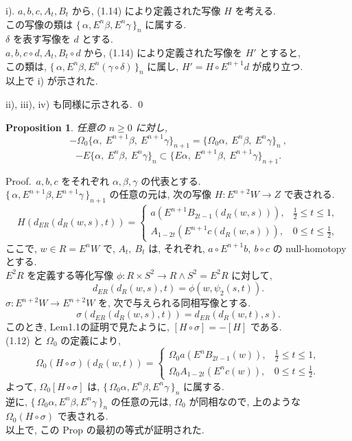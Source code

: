 \documentclass[12pt, leqno]{ltjsarticle}
\newcommand{\Ex}{E}        %
\newcommand{\todai}[2][]{\{\,#2\,\}_{#1}}      %
\numberwithin{equation}{section}
\theoremstyle{plain}
\newtheorem{proposition}[theorem]{Proposition}
\theoremstyle{definition}
\theoremstyle{remark}
\begin{document}
i). 
\(a,b,c,A_t,B_t\) から, (1.14) により定義された写像 \(H\)
を考える.\\
この写像の類は 
\(\todai[n]{\alpha, E^n\beta, E^n\gamma}\)
に属する.\\
\(\delta\) を表す写像を \(d\) とする.\\
\(a,b,c\circ d, A_t, B_t\circ d\) から, (1.14) により定義された写像を \(H'\)
とすると,\\
この類は, \(\todai[n]{\alpha, E^n\beta, E^n(\gamma\circ\delta)}\)
に属し, 
\(H'=H\circ E^{n+1}d\) が成り立つ.\\
以上で i) が示された.

ii), iii), iv) も同様に示される.
\qed


\begin{proposition}\label{prop:1-3}
任意の $n\ge 0$ に対し,
\[
-\Omega_0\bigl\{\alpha,\ \Ex^{n+1}\beta,\ \Ex^{n+1}\gamma\bigr\}_{n+1}
=
\bigl\{\Omega_0\alpha,\ \Ex^{n}\beta,\ \Ex^{n}\gamma\bigr\}_n \ ,
\]
\[
-\Ex\{\alpha,\ \Ex^n\beta,\ \Ex^n\gamma\}_n
\subset
\bigl\{E\alpha,\ \Ex^{n+1}\beta,\ \Ex^{n+1}\gamma\bigr\}_{n+1}.
\]
\end{proposition}

Proof.\
$a,b,c$ をそれぞれ $\alpha,\beta,\gamma$ の代表とする.\\
\(\todai[n+1]{\alpha, E^{n+1}\beta, E^{n+1}\gamma}\) 
の任意の元は, 次の写像 \(H:E^{n+2}W\to Z\)
で表される.
\[
H(d_{ER}(d_R(w,s),t))=
\begin{cases}
a(\Ex^{n+1}B_{2t-1}(d_R(w,s))), 
& \tfrac12\le t\le 1,\\[2mm]
A_{1-2t}(\Ex^{n+1}c(d_R(w,s))), 
& 0\le t\le \tfrac12,
\end{cases}
\]
ここで,
\(w\in R = E^n W\)
で,
\(A_t,\ B_t\) 
は, それぞれ,
\(a\circ E^{n+1}b,\ b\circ c\)
の null-homotopy とする.\\
\(E^2 R\) を定義する等化写像
\(\phi:R\times S^2\to R\wedge S^2 = E^2 R\)
に対して,
\[
d_{ER}(d_R(w,s),t) = \phi(w, \psi_2(s, t)).
\]
\(\sigma:E^{n+2}W\to E^{n+2}W\)
を, 次で与えられる同相写像とする.
\[
\sigma(d_{ER}(d_R(w,s),t))
= d_{ER}(d_R(w,t), s).
\]
このとき, Lem1.1の証明で見たように,
\([H\circ \sigma] = -[H]\) である.\\
(1.12) と \(\Omega_0\) の定義により,
\[
\Omega_0(H\circ \sigma)(d_R(w,t))=
\begin{cases}
\Omega_0 a(\Ex^{n}B_{2t-1}(w)), 
& \tfrac12\le t\le 1,\\[2mm]
\Omega_0 A_{1-2t}(\Ex^{n}c(w)), 
& 0\le t\le \tfrac12.
\end{cases}
\]
よって,
\(\Omega_0[H\circ \sigma]\)
は, 
\(\todai[n]{\Omega_0\alpha, E^n\beta, E^n\gamma}\)
に属する.\\
逆に, 
\(\todai[n]{\Omega_0\alpha, E^n\beta, E^n\gamma}\)
の任意の元は,
\(\Omega_0\) が同相なので,
上のような \(\Omega_0(H\circ \sigma)\) で表される.\\
以上で, この Prop の最初の等式が証明された.
\end{document}
